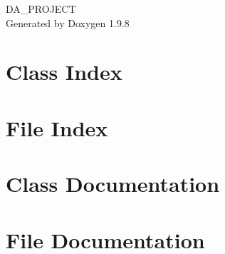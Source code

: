 \documentclass[twoside]{book}
\newcommand{\+}{\discretionary{\mbox{\scriptsize$\hookleftarrow$}}{}{}}
\newcommand{\clearemptydoublepage}{%
    \newpage{\pagestyle{empty}\cleardoublepage}%
  }
\begin{document}
  \raggedbottom
    \hypersetup{pageanchor=false,
                bookmarksnumbered=true,
                pdfencoding=unicode
               }
  \begin{titlepage}
  \vspace*{7cm}
  \begin{center}%
  {\Large DA\+\_\+\+PROJECT}\\
  \vspace*{1cm}
  {\large Generated by Doxygen 1.9.8}\\
  \end{center}
  \end{titlepage}
  \clearemptydoublepage
  \tableofcontents
  \clearemptydoublepage
  \hypersetup{pageanchor=true}
\chapter{Class Index}

\chapter{File Index}

\chapter{Class Documentation}















\chapter{File Documentation}






















  \backmatter
  \newpage
  \clearemptydoublepage
  \printindex
\end{document}
